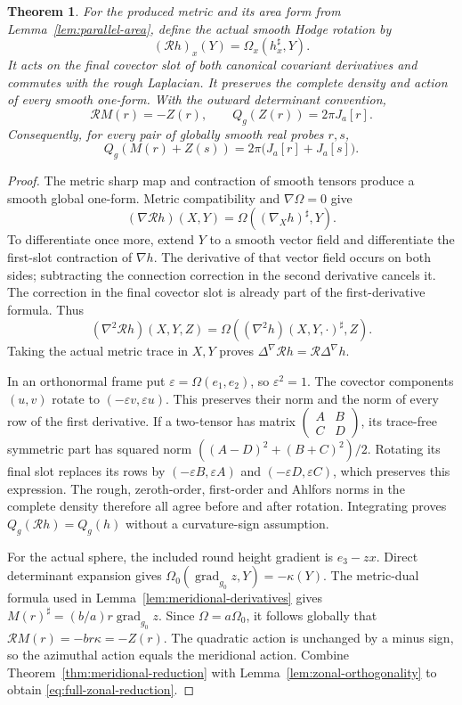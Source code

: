 \documentclass[11pt]{article}
\newtheorem{theorem}{Theorem}[section]
\begin{document}
\begin{theorem}\label{thm:zonal-reduction}
For the produced metric and its area form from Lemma~\ref{lem:parallel-area},
define the actual smooth Hodge rotation by
\[
 (\mathcal Rh)_x(Y)=\Omega_x(h_x^\sharp,Y).
\]
It acts on the final covector slot of both canonical covariant derivatives
and commutes with the rough Laplacian. It preserves the complete density
and action of every smooth one-form. With the outward determinant convention,
\[
 \mathcal R M(r)=-Z(r),\qquad Q_g(Z(r))=2\pi J_a[r].
\]
Consequently, for every pair of globally smooth real probes $r,s$,
\begin{equation}\label{eq:full-zonal-reduction}
 Q_g(M(r)+Z(s))=2\pi\bigl(J_a[r]+J_a[s]\bigr).
\end{equation}
\end{theorem}

\begin{proof}
The metric sharp map and contraction of smooth tensors produce a smooth
global one-form. Metric compatibility and $\nabla\Omega=0$ give
\[
 (\nabla\mathcal Rh)(X,Y)=\Omega((\nabla_Xh)^\sharp,Y).
\]
To differentiate once more, extend $Y$ to a smooth vector field and
differentiate the first-slot contraction of $\nabla h$. The derivative
of that vector field occurs on both sides; subtracting the connection
correction in the second derivative cancels it. The correction in the
final covector slot is already part of the first-derivative formula.
Thus
\[
 (\nabla^2\mathcal Rh)(X,Y,Z)
   =\Omega((\nabla^2h)(X,Y,\cdot)^\sharp,Z).
\]
Taking the actual metric trace in $X,Y$ proves
$\Delta^\nabla\mathcal Rh=\mathcal R\Delta^\nabla h$.

In an orthonormal frame put $\varepsilon=\Omega(e_1,e_2)$, so
$\varepsilon^2=1$. The covector components $(u,v)$ rotate to
$(-\varepsilon v,\varepsilon u)$. This preserves their norm and the
norm of every row of the first derivative. If a two-tensor has matrix
$\left(\begin{smallmatrix}A&B\\C&D\end{smallmatrix}\right)$, its
trace-free symmetric part has squared norm
$((A-D)^2+(B+C)^2)/2$. Rotating its final slot replaces its rows by
$(-\varepsilon B,\varepsilon A)$ and
$(-\varepsilon D,\varepsilon C)$, which preserves this expression.
The rough, zeroth-order, first-order and Ahlfors norms in the complete
density therefore all agree before and after rotation. Integrating
proves $Q_g(\mathcal Rh)=Q_g(h)$ without a curvature-sign assumption.

For the actual sphere, the included round height gradient is
$e_3-zx$. Direct determinant expansion gives
$\Omega_0(\operatorname{grad}_{g_0}z,Y)=-\kappa(Y)$.
The metric-dual formula used in Lemma~\ref{lem:meridional-derivatives}
gives $M(r)^\sharp=(b/a)r\operatorname{grad}_{g_0}z$.
Since $\Omega=a\Omega_0$, it follows globally that
$\mathcal RM(r)=-br\kappa=-Z(r)$. The quadratic action is unchanged
by a minus sign, so the azimuthal action equals the meridional action.
Combine Theorem~\ref{thm:meridional-reduction} with
Lemma~\ref{lem:zonal-orthogonality} to obtain
\eqref{eq:full-zonal-reduction}.
\end{proof}
\end{document}
